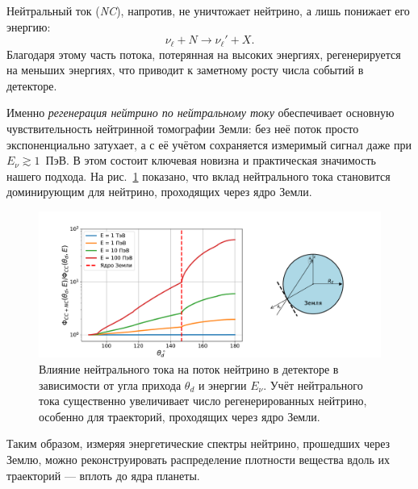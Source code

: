 Нейтральный ток (\textit{NC}), напротив, не уничтожает нейтрино, а лишь понижает его энергию:
\[
\nu_\ell + N \to \nu_\ell' + X.
\]
Благодаря этому часть потока, потерянная на высоких энергиях, регенерируется на меньших энергиях, что приводит к заметному росту числа событий в детекторе.

Именно \emph{регенерация нейтрино по нейтральному току} обеспечивает основную чувствительность нейтринной томографии Земли: без неё поток просто экспоненциально затухает, а с её учётом сохраняется измеримый сигнал даже при $E_\nu \gtrsim 1$~ПэВ.  
В этом состоит ключевая новизна и практическая значимость нашего подхода.  
На рис.~\ref{EF1} показано, что вклад нейтрального тока становится доминирующим для нейтрино, проходящих через ядро Земли.

\begin{figure}[!h]
\centering
\includegraphics[width=\linewidth]{images/NuProp/rhh12zf_flux_index_CT18ZNNLO.pdf}
\caption{Влияние нейтрального тока на поток нейтрино в детекторе в зависимости от угла прихода $\theta_d$ и энергии $E_\nu$.  
Учёт нейтрального тока существенно увеличивает число регенерированных нейтрино, особенно для траекторий, проходящих через ядро Земли.}
\label{EF1}
\end{figure}

Таким образом, измеряя энергетические спектры нейтрино, прошедших через Землю, можно реконструировать распределение плотности вещества вдоль их траекторий — вплоть до ядра планеты.



